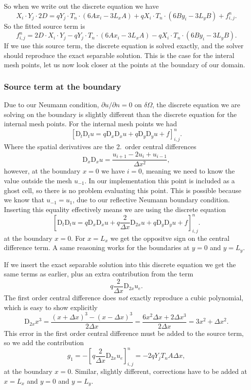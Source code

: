 \documentclass[a4paper, 11pt, notitlepage, english]{article}
\newcommand{\p}{\partial}
\newcommand{\D}{\mbox{D}}
\begin{document}
So when we write out the discrete equation we have
$$X_i \cdot Y_j \cdot 2D = q Y_j \cdot T_n \cdot(6Ax_i - 3L_x A) + qX_i\cdot T_n \cdot(6By_i - 3L_y B) + f_{i,j}^n.$$
So the fitted source term is
$$f_{i,j}^n = 2D\cdot X_i\cdot Y_j - q Y_j \cdot T_n \cdot(6Ax_i - 3L_xA) - qX_i\cdot T_n \cdot(6By_i - 3L_yB).$$
If we use this source term, the discrete equation is solved exactly, and the solver should reproduce the exact separable solution. This is the case for the interal mesh
points, let us now look closer at the points at the boundary of our domain.

\subsubsection*{Source term at the boundary}

Due to our Neumann condition, $\p u/\p n = 0$ on $\delta \Omega$, the discrete equation we are solving on the boundary is slightly different than the discrete equation 
for the internal mesh points. For the internal mesh points we had
$$[\D_t\D_t u = q \D_x \D_x u + q \D_y \D_y u + f]^{n}_{i,j}.$$
Where the spatial derivatives are the 2.\ order central differences
$$\D_x \D_x u = \frac{u_{i+1} - 2u_i + u_{i-1}}{\Delta x^2},$$
however, at the boundary $x = 0$ we have $i=0$, meaning we need to know the value outside the mesh $u_{-1}$. In our implementation this point is included as a 
ghost cell, so there is no problem evaluating this point. This is possible because we know that $u_{-1} = u_{1}$, due to our reflective Neumann boundary condition. 
Inserting this equality effectively means we are using the discrete equation
$$[\D_t\D_t u = q \D_x \D_x u + q\frac{2}{\Delta x} \D_{2x}u +  q \D_y \D_y u + f]^{n}_{i,j}.$$
at the boundary $x = 0$. For $x=L_x$ we get the oppositve sign on the central difference term. A same reasoning works for the boundaries at $y=0$ and $y=L_y$.

If we insert the exact separable solution into this discrete equation we get the same terms as earlier, plus an extra contribution from the term
$$q\frac{2}{\Delta x} \D_{2x} u_e.$$
The first order central difference does \emph{not} exactly reproduce a cubic polynomial, which is easy to show explicitly
$$\D_{2x} x^3 = \frac{(x+\Delta x)^3 - (x-\Delta x)^3}{2\Delta x} = \frac{6x^2\Delta x + 2\Delta x^3}{2\Delta x} = 3x^2 + \Delta x^2.$$
This error in the first order central difference must be added to the source term, so we add the contribution
$$g_1 = -[q\frac{2}{\Delta x} \D_{2x} u_e]_{i,j}^n = -2qY_jT_n A \Delta x,$$
at the boundary $x = 0$. Similar, slightly different, corrections have to be added at $x=L_x$ and $y=0$ and $y=L_y$.
\end{document}
